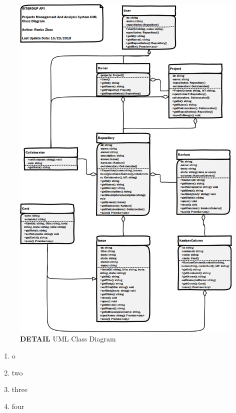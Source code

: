 \documentclass[12pt,a4paper]{report}
\begin{document}
\begin{figure}[h]
	\centering
	\includegraphics[height=0.95\textheight]{./pics/ClassDiagram.png}
	\caption{\textbf{DETAIL} UML Class Diagram}
\end{figure}


\cleardoublepage
\listoffigures
\cleardoublepage
\listoftables

\begin{enumerate}
\renewcommand{\labelenumi}{{\textbf{\arabic{enumi}.}}}
\item o
\item two
\item three
\item four
\end{enumerate}
\end{document}
